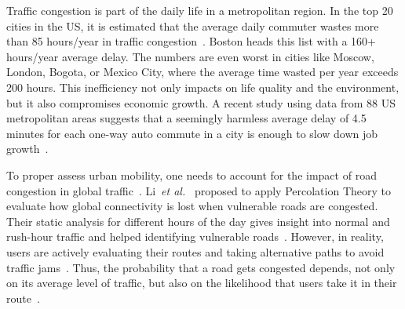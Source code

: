 \documentclass[aps,prl,twocolumn,showpacs,
superscriptaddress,floatfix, 10pt]{revtex4-1}
\begin{document}
\maketitle

Traffic congestion is part of the daily life in a metropolitan region. In
the top 20 cities in the US, it is estimated that the average daily
commuter wastes more than 85 hours/year in traffic
congestion~\cite{GlobalTrafficReport2018}. Boston heads this list with a
160+ hours/year average delay. The numbers are even worst in cities like
Moscow, London, Bogota, or Mexico City, where the average time wasted per
year exceeds 200 hours. This inefficiency not only impacts on life quality
and the environment, but it also compromises economic growth. A recent
study using data from 88 US metropolitan areas suggests that a seemingly
harmless average delay of 4.5 minutes for each one-way auto commute in a
city is enough to slow down job growth~\cite{Sweet2014}.
	
To proper assess urban mobility, one needs to account for the impact of
road congestion in global traffic~\cite{Louf2014,Colak2016,Sole-Ribalta2018,Barbosa2018,Barthelemy2019}. 
Li~\textit{et al.}~\cite{Li2015} proposed to apply Percolation Theory to evaluate how
global connectivity is lost when vulnerable roads are congested.
Their static analysis for different hours of the day
gives insight into normal and rush-hour traffic and helped identifying
vulnerable roads~\cite{Gonzalez2008,Colak2016,Olmos2018,Zeng2019}.
However, in reality, users are actively evaluating their routes and taking
alternative paths to avoid traffic jams~\cite{Zhu2015,Lima2016,Zhang2019}. 
Thus, the probability that a road gets congested depends, not
only on its average level of traffic, but also on the likelihood that users
take it in their route~\cite{Wang2012,Guo2019}. 
	
\end{document}
